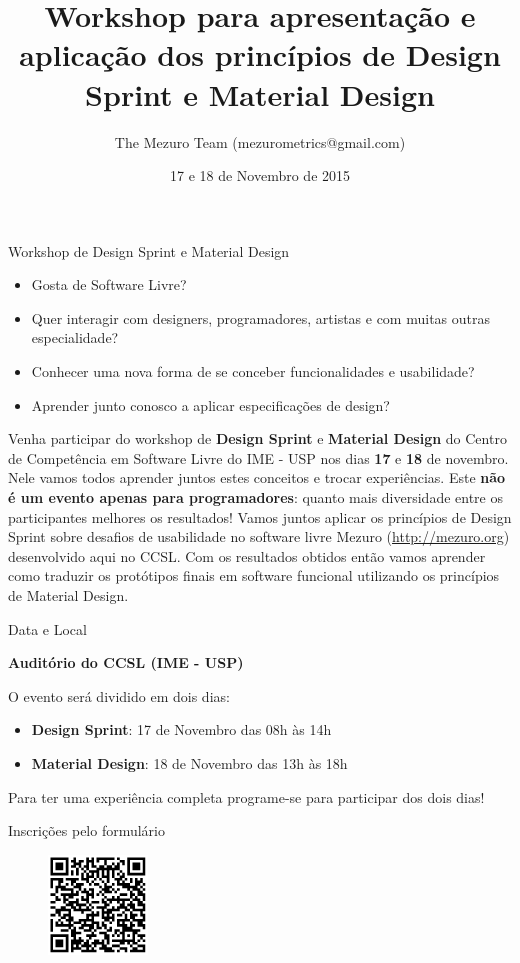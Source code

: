 \documentclass[final]{beamer} %
\title[Design Sprint \& Material Design]{Workshop para apresentação e aplicação dos princípios de Design Sprint e Material Design}
\author[Mezuro]{The Mezuro Team (mezurometrics@gmail.com)}
\institute[CCSL - IME - USP]{Centro de Competência em Software Livre, Instituto de Matemática e Estatística da universidade de São Paulo}
\date{17 e 18 de Novembro de 2015}
\begin{document}
  \begin{frame}{}
    \vfill
    {\veryHuge Workshop de Design Sprint e Material Design}
    \vfill
    \begin{itemize}
      \item {\large Gosta de Software Livre?}
      \item {\large Quer interagir com designers, programadores, artistas e com muitas outras especialidade?}
      \item {\large Conhecer uma nova forma de se conceber funcionalidades e usabilidade?}
      \item {\large Aprender junto conosco a aplicar especificações de design?}
    \end{itemize}
    \vfill
    {\large Venha participar do workshop de \textbf{Design Sprint} e \textbf{Material Design} do Centro de Competência em Software Livre do IME - USP nos dias \textbf{17} e \textbf{18} de novembro. Nele vamos todos aprender juntos estes conceitos e trocar experiências. Este \textbf{não é um evento apenas para programadores}: quanto mais diversidade entre os participantes melhores os resultados!}
    \vfill
    {\large Vamos juntos aplicar os princípios de Design Sprint sobre desafios de usabilidade no software livre Mezuro (\url{http://mezuro.org}) desenvolvido aqui no CCSL. Com os resultados obtidos então vamos aprender como traduzir os protótipos finais em software funcional utilizando os princípios de Material Design.}
    \vfill
    \begin{block}{\large Data e Local}
      \begin{center}
        \textbf{Auditório do CCSL (IME - USP)}
      \end{center}

        O evento será dividido em dois dias:

        \begin{itemize}
          \item \textbf{Design Sprint}: 17 de Novembro das 08h às 14h
          \item \textbf{Material Design}: 18 de Novembro das 13h às 18h
        \end{itemize}

        Para ter uma experiência completa programe-se para participar dos dois dias!
    \end{block}
    \vfill
    \begin{block}{\large Inscrições pelo formulário}
      \center
      \begin{figure}[h]
        \includegraphics[height=100px]{design_sprint_form_qr}
      \end{figure}


\end{block}
\end{frame}
\end{document}
